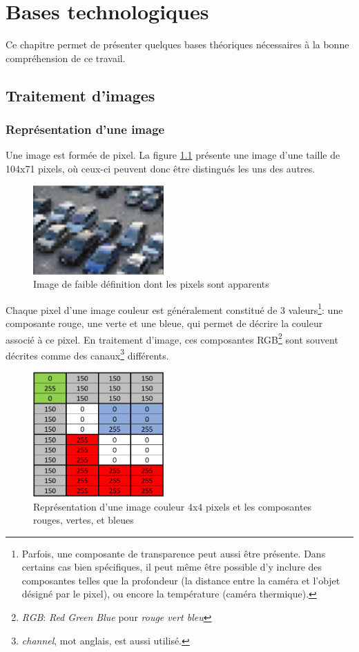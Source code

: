 \chapter{Bases technologiques}
Ce chapitre permet de présenter quelques bases théoriques nécessaires à la bonne compréhension de ce travail. 

\section{Traitement d'images}
\subsection{Représentation d'une image}\label{techno.traitement.repr}
Une image est formée de pixel. La figure \ref{fig:pixels} présente une image d'une taille de 104x71 pixels, où ceux-ci peuvent donc être distingués les uns des autres.

\begin{figure}[ht]
    \includegraphics[width=50mm]{img/bases_technologiques/pixels.png}
    \centering
    \caption{Image de faible définition dont les pixels sont apparents}
    \label{fig:pixels}
\end{figure}

Chaque pixel d'une image couleur est généralement constitué de 3 valeurs\footnote{Parfois, une composante de transparence peut aussi être présente. Dans certains cas bien spécifiques, il peut même être possible d'y inclure des composantes telles que la profondeur (la distance entre la caméra et l'objet désigné par le pixel), ou encore la température (caméra thermique).}: une composante rouge, une verte et une bleue, qui permet de décrire la couleur associé à ce pixel. En traitement d'image, ces composantes RGB\footnote{\textit{RGB}: \textit{Red Green Blue} pour \textit{rouge vert bleu}} sont souvent décrites comme des canaux\footnote{\textit{channel}, mot anglais, est aussi utilisé.} différents.

\begin{figure}[ht]
    \includegraphics[width=50mm]{img/bases_technologiques/images_pixels.png}
    \centering
    \caption{Représentation d'une image couleur 4x4 pixels et les composantes rouges, vertes, et bleues}
\end{figure}

